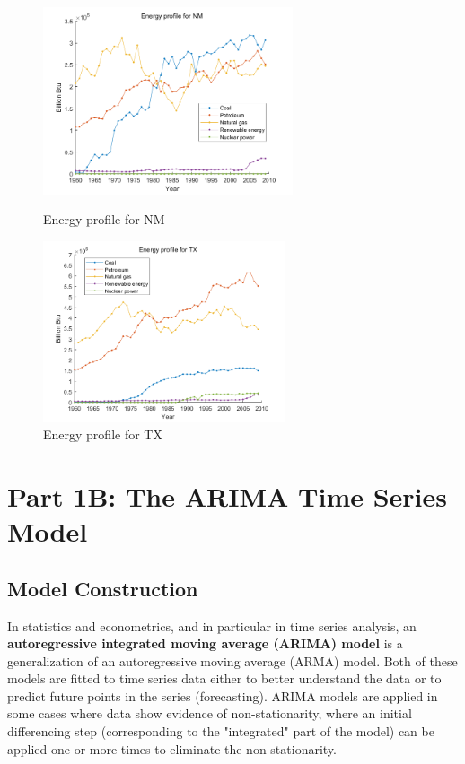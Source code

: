 \documentclass{mcmthesis}
\begin{document}
\begin{figure}
\begin{minipage}[t]{0.5\linewidth}
\centering
\includegraphics[width=2.9in]{./picture/NM.png}
\caption{Energy profile for NM}
\label{fig:left:2}
\end{minipage}
\begin{minipage}[t]{0.5\linewidth}
\centering
\includegraphics[width=2.8in]{./picture/TX.png}
\caption{Energy profile for TX}
\label{fig:right:2}
\end{minipage}
\end{figure}     

\section{Part 1B: The ARIMA Time Series Model}

\subsection{Model Construction}

In statistics and econometrics, and in particular in time series analysis, an {\bf{autoregressive integrated moving average (ARIMA) model}} is a generalization of an autoregressive moving average (ARMA) model. Both of these models are fitted to time series data either to better understand the data or to predict future points in the series (forecasting). ARIMA models are applied in some cases where data show evidence of non-stationarity, where an initial differencing step (corresponding to the "integrated" part of the model) can be applied one or more times to eliminate the non-stationarity\cite{SAS2015Notation}.
\end{document}

